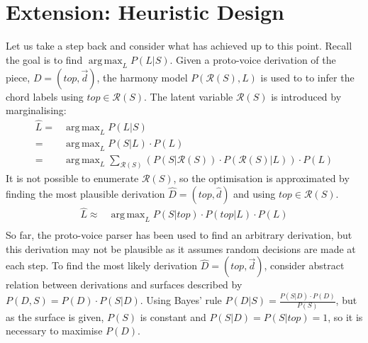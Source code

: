 \documentclass[12pt,a4paper,twoside,openany]{report} \usepackage[pdfborder={0 0 0}]{hyperref}    %
\DeclareMathOperator*{\argmax}{arg\,max} \DeclareMathOperator*{\argmin}{arg\,min}
\theoremstyle{definition} \newtheorem{definition}{Definition}[section]
\begin{document}
\section{Extension: Heuristic Design}
\label{sec:extensionImplementation}
Let us take a step back and consider what has achieved up to this point. Recall the goal is to find $\argmax_L P(L|S)$. 
Given a proto-voice derivation of the piece, $D= (top, \vec{d})$, the harmony model $P(\mathcal{R}(S),L)$ is used to to
infer the chord labels using $top \in \mathcal{R}(S)$. The latent variable $\mathcal{R}(S)$ is introduced by marginalising: 
\begin{equation} \begin{aligned} 
  \hat{L} =& \argmax_L P(L|S)\\ 
  =& \argmax_L P(S|L) \cdot P(L) \\ 
  =& \argmax_L \sum\limits_{\mathcal{R}(S)}(P(S|\mathcal{R}(S))\cdot P(\mathcal{R}(S)|L))\cdot P(L) 
\end{aligned} 
  \label{eq:} 
\end{equation} 
  It is not possible to enumerate $\mathcal{R}(S)$, so the optimisation is approximated by finding the most plausible
  derivation $\hat{D} = (top, \hat{d})$ and
  using $top \in \mathcal{R}(S)$.
  \begin{equation} 
    \begin{aligned} 
      \hat{L} \approx& \argmax_L P(S|top) \cdot P(top | L) \cdot P(L)\\
  \end{aligned} \label{eq:} \end{equation}
  So far, the proto-voice parser has been used to find an arbitrary derivation, but this derivation may not be plausible
  as it assumes random decisions are made at each step. To find the most likely derivation $\hat{D} = (top, \vec{d})$, consider
  abstract relation between derivations and surfaces described by $P(D, S) = P(D)\cdot P(S|D)$. Using Bayes' rule
  $P(D|S)=\frac{P(S|D)\cdot P(D)}{P(S)}$, but as the surface is given, $P(S)$ is constant and $P(S|D) = P(S|top) = 1$, so it is necessary to maximise $P(D)$.
\end{document}
